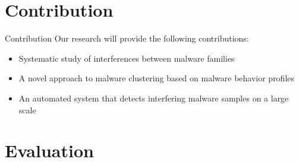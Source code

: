 \documentclass{beamer}
\begin{document}


\section{Contribution}
\begin{frame}[t]{Contribution}
Our research will provide the following contributions:
\begin{itemize}
  \item Systematic study of interferences between malware families
  \item A novel approach to malware clustering based on malware behavior profiles
  \item An automated system that detects interfering malware samples on a large scale
\end{itemize}
\end{frame}

\section{Evaluation}
\label{sec:Evaluation}
\end{document}

